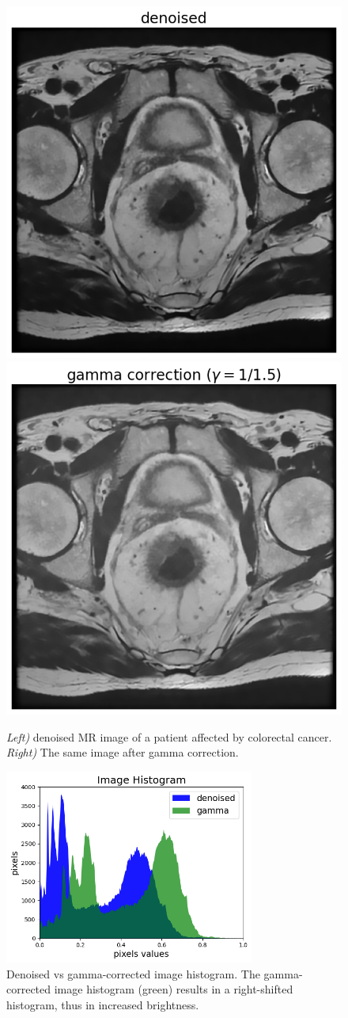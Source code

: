 \documentclass{standalone}
\begin{document}
\begin{figure}[htp]

    \centering
    \includegraphics[width=.49\textwidth]{../images/denoised.png}
    \includegraphics[width=.49\textwidth]{../images/gammacorrection.png}
    
    \caption{ \textit{ Left)} denoised MR image of a patient affected by colorectal cancer.\textit{ Right)} The same image after gamma correction.}
    \label{denoisedgamma}
    
    \end{figure}

\begin{figure}[htp]

    \centering
    \includegraphics[width=0.73\textwidth]{../images/gammahist.png}

    
    \caption{Denoised vs gamma-corrected image histogram. The gamma-corrected image histogram (green) results in a right-shifted histogram,  thus in increased brightness.}
    \label{histogamma}
    
    \end{figure}
\end{document}
